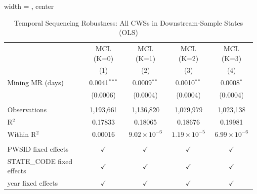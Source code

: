 
\begin{table}[htbp]
   
   \caption{\label{tab:strategic_lead_lag_robustness} Temporal Sequencing Robustness: All CWSs in Downstream-Sample States (OLS)}
   \bigskip
   
   \centering
   
   \begin{adjustbox}{width = \textwidth, center}
      
      
      \begin{tabular}{lcccc}
         \toprule
         
                                    & MCL (K=0)      & MCL (K=1)             & MCL (K=2)             & MCL (K=3)\\  
         
                                    & (1)            & (2)                   & (3)                   & (4)\\  
         
         \midrule 
         Mining MR (days)           & 0.0041$^{***}$ & 0.0009$^{**}$         & 0.0010$^{**}$         & 0.0008$^{*}$\\   
                                    & (0.0006)       & (0.0004)              & (0.0004)              & (0.0004)\\   
         
          \\
         
         Observations               & 1,193,661      & 1,136,820             & 1,079,979             & 1,023,138\\  
         R$^2$                      & 0.17833        & 0.18065               & 0.18676               & 0.19981\\  
         Within R$^2$               & 0.00016        & $9.02\times 10^{-6}$  & $1.19\times 10^{-5}$  & $6.99\times 10^{-6}$\\   
         
          \\
         
         PWSID fixed effects        & $\checkmark$   & $\checkmark$          & $\checkmark$          & $\checkmark$\\   
         STATE\_CODE fixed effects  & $\checkmark$   & $\checkmark$          & $\checkmark$          & $\checkmark$\\   
         year fixed effects         & $\checkmark$   & $\checkmark$          & $\checkmark$          & $\checkmark$\\   
         

\end{tabular}
\end{adjustbox}
\end{table}
